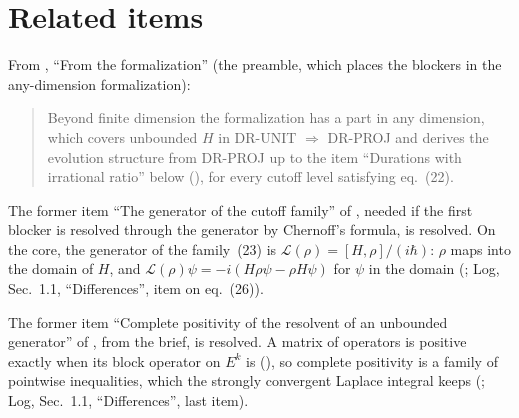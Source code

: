 \documentclass[11pt]{article}
\begin{document}
\section{Related items}\label{sec:related}

From , ``From the formalization'' (the preamble, which places the
blockers in the any-dimension formalization):

\begin{quote}
Beyond finite dimension the formalization has a part in any dimension, which covers
unbounded $H$ in DR-UNIT $\Rightarrow$ DR-PROJ and derives the evolution structure
 from DR-PROJ up to the item ``Durations with irrational ratio'' below
(), for every cutoff level satisfying
eq.~(22).
\end{quote}

\noindent
The former item ``The generator of the cutoff family'' of , needed if the
first blocker is resolved through the generator by Chernoff's formula, is resolved. On the core,
the generator
of the family~(23) is $\mathcal{L}(\rho) = [H,\rho]/(i\hbar)$: $\rho$ maps into the domain of $H$,
and $\mathcal{L}(\rho)\psi = -i(H\rho\psi - \rho H\psi)$ for $\psi$ in the domain
(; Log, Sec.~1.1, ``Differences'', item on eq.~(26)).

\noindent
The former item ``Complete positivity of the resolvent of an unbounded generator'' of
, from the brief, is resolved. A matrix of operators is positive exactly
when its block operator on $E^k$ is (), so complete positivity is a
family of pointwise inequalities, which the strongly convergent Laplace integral keeps
(; Log, Sec.~1.1, ``Differences'', last item).
\end{document}
